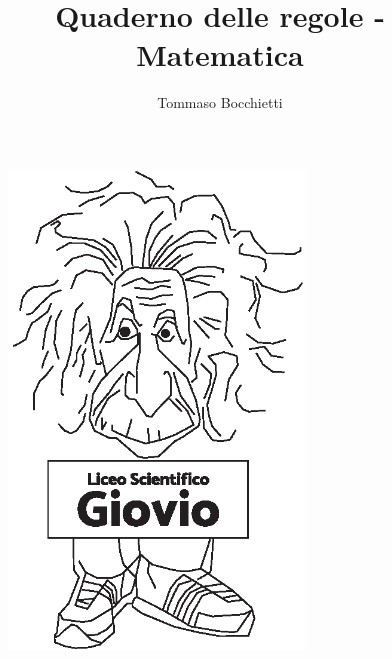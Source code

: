 \documentclass{../.common/high-school-notebook}
\begin{document}
\graphicspath{{../.common/}}

\title{Quaderno delle regole - Matematica}
\author{Tommaso Bocchietti}

\maketitle

\begin{figure}[H]
  \centering
  \includegraphics[width=0.7\textwidth]{../.common/Einstein_Logo}
  \label{fig:Einstein_Logo}
\end{figure}


\pagebreak
\tableofcontents

% 

% 
% 
% 
% 

\pagebreak



% 
% 

% 
% 
% 
% 
% 
% 
% 
% 
\end{document}

